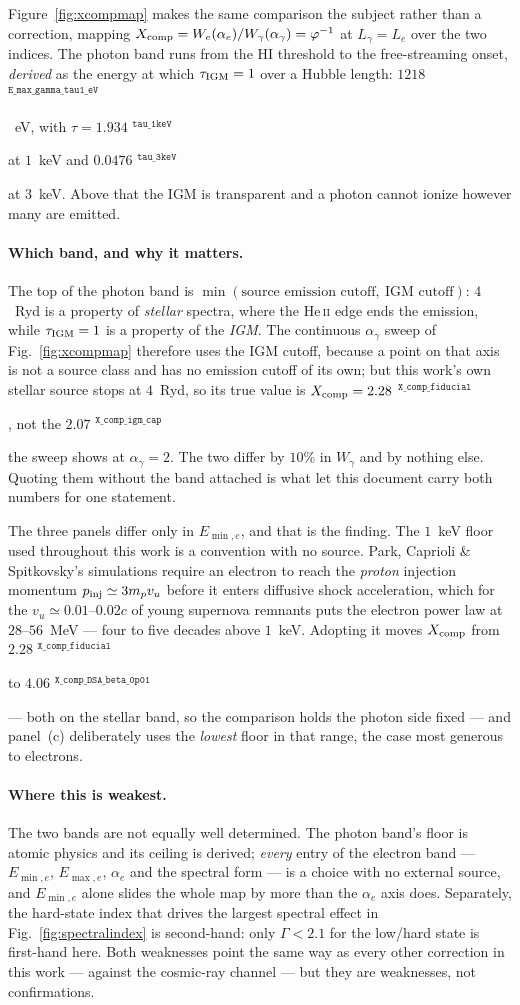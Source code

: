 \documentclass[11pt,a4paper]{article}
\newif\ifprovdraft
\newcommand{\src}[1]{%
  \ifprovdraft
    \ifmmode{}^{\text{\color{gray}\scriptsize\texttt{#1}}}%
    \else{\color{gray}\scriptsize$^{\texttt{#1}}$}%
    \fi
  \fi}
\begin{document}
Figure~\ref{fig:xcompmap} makes the same comparison the subject rather than a
correction, mapping
$X_{\rm comp}=W_e(\alpha_e)/W_\gamma(\alpha_\gamma)=\varphi^{-1}$ at
$L_\gamma=L_e$ over the two indices. The photon band runs from the HI threshold to
the free-streaming onset, \emph{derived} as the energy at which
$\tau_{\rm IGM}=1$ over a Hubble length: $1218$\src{E\_max\_gamma\_tau1\_eV}~eV, with
$\tau=1.934$\src{tau\_1keV} at $1$~keV and
$0.0476$\src{tau\_3keV} at $3$~keV. Above that the IGM is transparent and a photon
cannot ionize however many are emitted.

\paragraph{Which band, and why it matters.} The top of the photon band is
$\min(\text{source emission cutoff},\ \text{IGM cutoff})$: $4$~Ryd is a property
of \emph{stellar} spectra, where the He\,\textsc{ii} edge ends the emission,
while $\tau_{\rm IGM}=1$ is a property of the \emph{IGM}. The continuous
$\alpha_\gamma$ sweep of Fig.~\ref{fig:xcompmap} therefore uses the IGM cutoff,
because a point on that axis is not a source class and has no emission cutoff of
its own; but this work's own stellar source stops at $4$~Ryd, so its true value
is $X_{\rm comp}=2.28$\src{X\_comp\_fiducial}, not the
$2.07$\src{X\_comp\_igm\_cap} the sweep shows at $\alpha_\gamma=2$. The two
differ by $10$\% in $W_\gamma$ and by nothing else. Quoting them without the
band attached is what let this document carry both numbers for one statement.

The three panels differ only in $E_{\min,e}$, and that is the finding. The
$1$~keV floor used throughout this work is a convention with no source. Park,
Caprioli \& Spitkovsky's simulations require an electron to reach the \emph{proton}
injection momentum $p_{\rm inj}\simeq3m_pv_u$ before it enters diffusive shock
acceleration, which for the $v_u\simeq0.01$--$0.02c$ of young supernova remnants
puts the electron power law at $28$--$56$~MeV --- four to five decades above
$1$~keV. Adopting it moves $X_{\rm comp}$ from
$2.28$\src{X\_comp\_fiducial} to $4.06$\src{X\_comp\_DSA\_beta\_0p01} --- both on
the stellar band, so the comparison holds the photon side fixed --- and panel~(c)
deliberately uses the \emph{lowest} floor in that range, the case most generous to
electrons.

\paragraph{Where this is weakest.} The two bands are not equally well determined.
The photon band's floor is atomic physics and its ceiling is derived; \emph{every}
entry of the electron band --- $E_{\min,e}$, $E_{\max,e}$, $\alpha_e$ and the
spectral form --- is a choice with no external source, and $E_{\min,e}$ alone
slides the whole map by more than the $\alpha_e$ axis does. Separately, the
hard-state index that drives the largest spectral effect in
Fig.~\ref{fig:spectralindex} is second-hand: only $\Gamma<2.1$ for the low/hard
state is first-hand here. Both weaknesses point the same way as every other
correction in this work --- against the cosmic-ray channel --- but they are
weaknesses, not confirmations.
\end{document}
